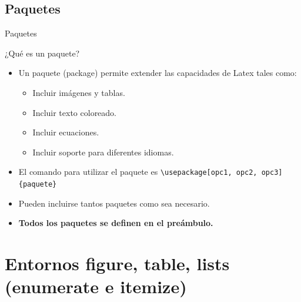 \documentclass[aspectratio=169, 10pt]{beamer}
\begin{document}
\subsection{Paquetes}
\begin{frame}[fragile]{Paquetes}
    \begin{alertblock}{¿Qué es un paquete?}
        
    \begin{itemize} 
        \item Un paquete (package) permite extender las capacidades de Latex tales como: \pause
        \begin{itemize}
            \item Incluir imágenes y tablas. \pause
            \item Incluir texto coloreado. \pause
            \item Incluir ecuaciones. \pause
            \item Incluir soporte para diferentes idiomas. \pause
        \end{itemize}

        \item El comando para utilizar el paquete es \verb|\usepackage[opc1, opc2, opc3]{paquete}| \pause
        
        \item Pueden incluirse tantos paquetes como sea necesario. \pause
        \item \textbf{Todos los paquetes se definen en el preámbulo.}
    \end{itemize}
    \end{alertblock}
\end{frame}



\section{Entornos figure, table, lists (enumerate e itemize)}
\end{document}
